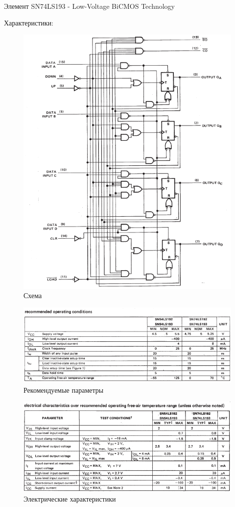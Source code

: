 Элемент SN74LS193 - Low-Voltage BiCMOS Technology

Характеристики:

\begin{figure}[H]
	\centering
	\includegraphics[width=0.95\linewidth]{imgs/14/14_sh}
	\caption{Схема}
	\label{fig:14_sh}
\end{figure}

\begin{figure}[H]
	\centering
	\includegraphics[width=0.95\linewidth]{imgs/14/14_rec}
	\caption{Рекомендуемые параметры}
	\label{fig:14_rec}
\end{figure}

\begin{figure}[H]
	\centering
	\includegraphics[width=0.95\linewidth]{imgs/14/14_ch}
	\caption{Электрические характеристики}
	\label{fig:14_ch}
\end{figure}

